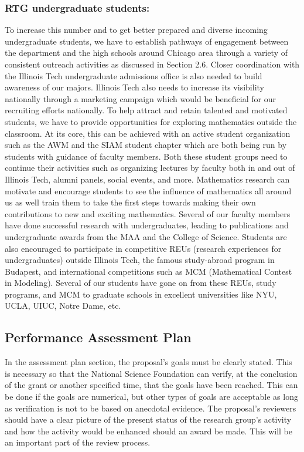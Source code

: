 \documentclass[11pt]{article}
\begin{document}
  \subsubsection*{RTG undergraduate students:} 
 To increase this number and to get better prepared and diverse incoming undergraduate students,
we have to establish pathways of engagement between the department and the high schools around Chicago area through a variety of consistent outreach activities as discussed in Section 2.6. Closer coordination with the Illinois Tech undergraduate admissions office is also needed to build awareness of our majors. Illinois Tech also needs to increase its visibility nationally through a marketing campaign which would be beneficial for our recruiting efforts nationally.
To help attract and retain talented and motivated students, we have to provide opportunities for exploring mathematics outside the classroom. At its core, this can be achieved with an active student organization such as the AWM and the SIAM student chapter which are both being run by students with guidance of faculty members. Both these student groups need to continue their activities such as organizing lectures by faculty both in and out of Illinois Tech, alumni panels, social events, and more. Mathematics research can motivate and encourage students to see the influence of mathematics all around us as well train them to take the first steps towards making their own contributions to new and exciting mathematics. Several of our faculty members have done successful research with undergraduates, leading to publications and undergraduate awards from the MAA and the College of Science. Students are also encouraged to participate in competitive REUs (research experiences for undergraduates) outside Illinois Tech, the famous study-abroad program in Budapest, and international competitions such as MCM (Mathematical Contest in Modeling). Several of our students have gone on from these REUs, study programs, and MCM to graduate schools in excellent universities like NYU, UCLA, UIUC, Notre Dame, etc.




\subsection{Performance Assessment Plan  }


 In the assessment plan section, the proposal's goals must be clearly stated. This is necessary so that the National Science Foundation can verify, at the conclusion of the grant or another specified time, that the goals have been reached. This can be done if the goals are numerical, but other types of goals are acceptable as long as verification is not to be based on anecdotal evidence. The proposal's reviewers should have a clear picture of the present status of the research group's activity and how the activity would be enhanced should an award be made. This will be an important part of the review process.
\end{document}
